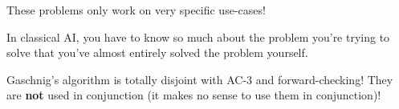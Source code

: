 \documentclass[10pt,\jkfside,a4paper]{article}
\begin{document}
{\color{blue}
These problems only work on very specific use-cases!

In classical AI, you have to know so much about the problem you're trying to
solve that you've almost entirely solved the problem yourself.

Gaschnig's algorithm is totally disjoint with AC-3 and forward-checking!
They are \textbf{not} used in conjunction (it makes no sense to use them in
conjunction)!
}
\end{document}
